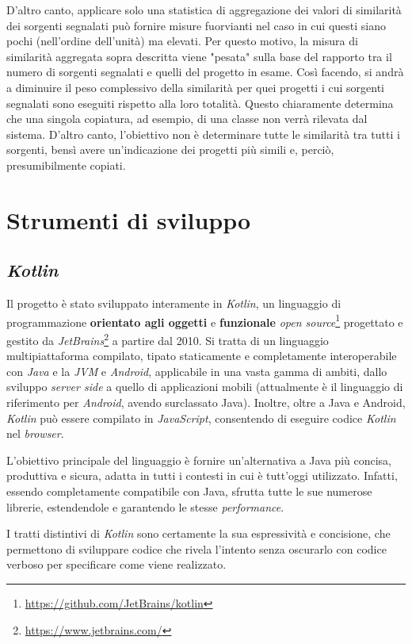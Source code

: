 D'altro canto, applicare solo una statistica di aggregazione dei valori di similarità dei sorgenti segnalati può fornire misure fuorvianti nel caso in cui questi siano pochi (nell'ordine dell'unità) ma elevati.
%
Per questo motivo, la misura di similarità aggregata sopra descritta viene "pesata" sulla base del rapporto tra il numero di sorgenti segnalati e quelli del progetto in esame.
%
Così facendo, si andrà a diminuire il peso complessivo della similarità per quei progetti i cui sorgenti segnalati sono eseguiti rispetto alla loro totalità.
%
Questo chiaramente determina che una singola copiatura, ad esempio, di una classe non verrà rilevata dal sistema.
%
D'altro canto, l'obiettivo non è determinare tutte le similarità tra tutti i sorgenti, bensì avere un'indicazione dei progetti più simili e, perciò, presumibilmente copiati.

\section{Strumenti di sviluppo}

\subsection*{\textit{Kotlin}}
Il progetto è stato sviluppato interamente in \textit{Kotlin}, un linguaggio di programmazione \textbf{orientato agli oggetti} e \textbf{funzionale} \textit{open source}\footnote{\url{https://github.com/JetBrains/kotlin}} progettato e gestito da \textit{JetBrains}\footnote{\url{https://www.jetbrains.com/}} a partire dal 2010.
%
Si tratta di un linguaggio multipiattaforma compilato, tipato staticamente e  completamente interoperabile con \textit{Java} e la \textit{JVM} e \textit{Android}, applicabile in una vasta gamma di ambiti, dallo sviluppo \textit{server side} a quello di applicazioni mobili (attualmente è il linguaggio di riferimento per \textit{Android}, avendo surclassato Java).
%
Inoltre, oltre a Java e Android, \textit{Kotlin} può essere compilato in \textit{JavaScript}, consentendo di eseguire codice \textit{Kotlin} nel \textit{browser}.

L'obiettivo principale del linguaggio è fornire un'alternativa a Java più concisa, produttiva e sicura, adatta in tutti i contesti in cui è tutt'oggi utilizzato.
%
Infatti, essendo completamente compatibile con Java, sfrutta tutte le sue numerose librerie, estendendole e garantendo le stesse \textit{performance}.

I tratti distintivi di \textit{Kotlin} sono certamente la sua espressività e concisione, che permettono di sviluppare codice che rivela l'intento senza oscurarlo con codice verboso per specificare come viene realizzato.

